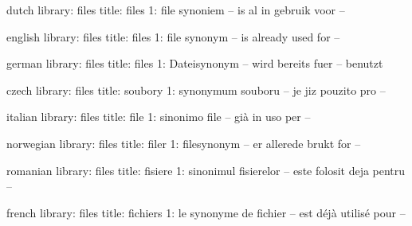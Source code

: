 

\unprotect

%

\startmessages  dutch  library: files
   title: files
       1: file synoniem -- is al in gebruik voor --
\stopmessages

\startmessages  english  library: files
   title: files
       1: file synonym -- is already used for --
\stopmessages

\startmessages  german  library: files
   title: files
       1: Dateisynonym -- wird bereits fuer -- benutzt
\stopmessages

\startmessages  czech  library: files
   title: soubory
       1: synonymum souboru -- je jiz pouzito pro --
\stopmessages

\startmessages  italian  library: files
   title: file
       1: sinonimo file -- già in uso per --
\stopmessages

\startmessages  norwegian  library: files
   title: filer
       1: filesynonym -- er allerede brukt for --
\stopmessages

\startmessages  romanian  library: files
   title: fisiere
       1: sinonimul fisierelor -- este folosit deja pentru --
\stopmessages

\startmessages  french  library: files
   title: fichiers
       1: le synonyme de fichier -- est déjà utilisé pour --
\stopmessages


\let\usedtempfile\gobbleonearguments

\def\registertempfile#1{\immediatewriteutilitycommand{\usedtempfile{#1}}}


